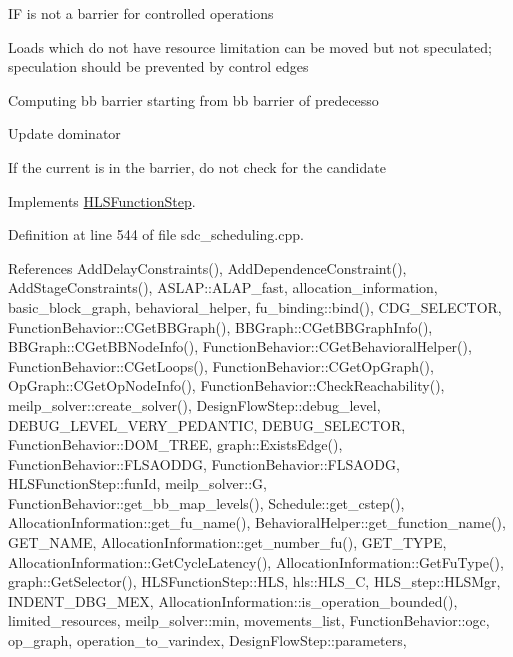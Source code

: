 IF is not a barrier for controlled operations

Loads which do not have resource limitation can be moved but not speculated; speculation should be prevented by control edges

Computing bb barrier starting from bb barrier of predecesso

Update dominator

If the current is in the barrier, do not check for the candidate 

Implements \hyperlink{classHLSFunctionStep_a8db4c00d080655984d98143206fc9fa8}{H\+L\+S\+Function\+Step}.



Definition at line 544 of file sdc\+\_\+scheduling.\+cpp.



References Add\+Delay\+Constraints(), Add\+Dependence\+Constraint(), Add\+Stage\+Constraints(), A\+S\+L\+A\+P\+::\+A\+L\+A\+P\+\_\+fast, allocation\+\_\+information, basic\+\_\+block\+\_\+graph, behavioral\+\_\+helper, fu\+\_\+binding\+::bind(), C\+D\+G\+\_\+\+S\+E\+L\+E\+C\+T\+OR, Function\+Behavior\+::\+C\+Get\+B\+B\+Graph(), B\+B\+Graph\+::\+C\+Get\+B\+B\+Graph\+Info(), B\+B\+Graph\+::\+C\+Get\+B\+B\+Node\+Info(), Function\+Behavior\+::\+C\+Get\+Behavioral\+Helper(), Function\+Behavior\+::\+C\+Get\+Loops(), Function\+Behavior\+::\+C\+Get\+Op\+Graph(), Op\+Graph\+::\+C\+Get\+Op\+Node\+Info(), Function\+Behavior\+::\+Check\+Reachability(), meilp\+\_\+solver\+::create\+\_\+solver(), Design\+Flow\+Step\+::debug\+\_\+level, D\+E\+B\+U\+G\+\_\+\+L\+E\+V\+E\+L\+\_\+\+V\+E\+R\+Y\+\_\+\+P\+E\+D\+A\+N\+T\+IC, D\+E\+B\+U\+G\+\_\+\+S\+E\+L\+E\+C\+T\+OR, Function\+Behavior\+::\+D\+O\+M\+\_\+\+T\+R\+EE, graph\+::\+Exists\+Edge(), Function\+Behavior\+::\+F\+L\+S\+A\+O\+D\+DG, Function\+Behavior\+::\+F\+L\+S\+A\+O\+DG, H\+L\+S\+Function\+Step\+::fun\+Id, meilp\+\_\+solver\+::G, Function\+Behavior\+::get\+\_\+bb\+\_\+map\+\_\+levels(), Schedule\+::get\+\_\+cstep(), Allocation\+Information\+::get\+\_\+fu\+\_\+name(), Behavioral\+Helper\+::get\+\_\+function\+\_\+name(), G\+E\+T\+\_\+\+N\+A\+ME, Allocation\+Information\+::get\+\_\+number\+\_\+fu(), G\+E\+T\+\_\+\+T\+Y\+PE, Allocation\+Information\+::\+Get\+Cycle\+Latency(), Allocation\+Information\+::\+Get\+Fu\+Type(), graph\+::\+Get\+Selector(), H\+L\+S\+Function\+Step\+::\+H\+LS, hls\+::\+H\+L\+S\+\_\+C, H\+L\+S\+\_\+step\+::\+H\+L\+S\+Mgr, I\+N\+D\+E\+N\+T\+\_\+\+D\+B\+G\+\_\+\+M\+EX, Allocation\+Information\+::is\+\_\+operation\+\_\+bounded(), limited\+\_\+resources, meilp\+\_\+solver\+::min, movements\+\_\+list, Function\+Behavior\+::ogc, op\+\_\+graph, operation\+\_\+to\+\_\+varindex, Design\+Flow\+Step\+::parameters, 